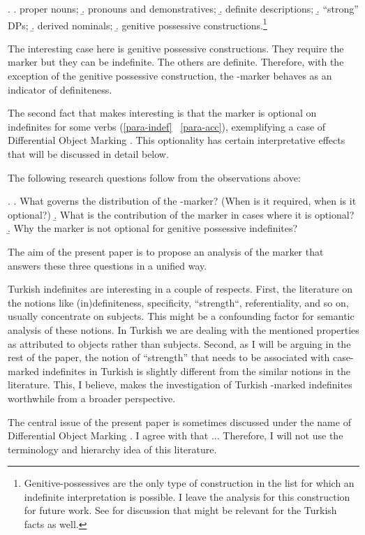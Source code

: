 \documentclass[11pt,a4paper]{article}
\begin{document}
\ex.
\a. proper nouns;
\b. pronouns and demonstratives;
\b. definite descriptions;
\b. ``strong'' DPs; %
\b. derived nominals;
\b. genitive possessive constructions.\footnote{Genitive-possessives
are the only type of construction in the list for which an indefinite
interpretation is possible. I leave the analysis for this construction
for future work. See  for discussion that might be
relevant for the Turkish facts as well.}

The interesting case here is genitive possessive constructions. They require the
marker but they can be indefinite. The others are definite. Therefore, with the
exception of the genitive possessive construction, the \acc-marker behaves as an
indicator of definiteness.

The second fact that makes  interesting is that the marker is
optional on indefinites for some verbs (\ref{para-indef} \versus\
\ref{para-acc}), exemplifying a case of Differential Object Marking
\cttxp{aissen03}. This optionality has certain interpretative effects
that will be discussed in detail below.

The following research questions follow from the observations above:

\ex.\label{res-ques}
\a.\label{res-ques-syn} What governs the distribution of the \acc-marker? (When
is it required, when is it optional?)
\b.\label{res-ques-sem} What is the contribution of the marker in cases where it is optional?
\b.\label{res-ques-genposs} Why the marker is not optional for genitive possessive indefinites?


The aim of the present paper is to propose an analysis of the marker that
answers these three questions in a unified way.

Turkish indefinites are interesting in a couple of respects. First,
the literature on the notions like (in)definiteness, specificity,
``strength``, referentiality, and so on, usually concentrate on
subjects. This might be a confounding factor for semantic analysis of
these notions. In Turkish we are dealing with the mentioned properties
as attributed to objects rather than subjects.  Second, as I will be
arguing in the rest of the paper, the notion of ``strength'' that
needs to be associated with case-marked indefinites in Turkish is
slightly different from the similar notions in the literature. This, I
believe, makes the investigation of Turkish \acc-marked indefinites
worthwhile from a broader perspective. 

The central issue of the present paper is sometimes discussed under
the name of Differential Object Marking \cttxp{aissen03}. I agree with
\ctnm{lopez12} that ... Therefore, I will not use the terminology and
hierarchy idea of this literature.
\end{document}
